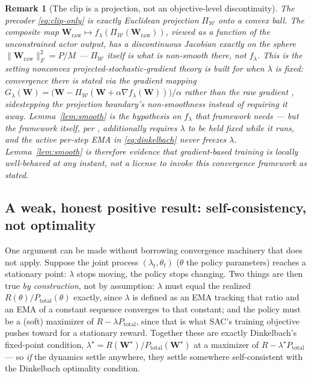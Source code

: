 \documentclass[11pt]{article}
\newtheorem{remark}{Remark}
\begin{document}
\begin{remark}[The clip is a projection, not an objective-level discontinuity]
The precoder \eqref{eq:clip-only} is exactly Euclidean projection
$\Pi_{\mathcal{W}}$ onto a convex ball. The composite map
$\mathbf{W}_{\text{raw}}\mapsto f_\lambda(\Pi_{\mathcal{W}}(\mathbf{W}_{\text{raw}}))$,
viewed as a function of the unconstrained actor output, has a discontinuous
Jacobian exactly on the sphere $\|\mathbf{W}_{\text{raw}}\|_F^2=P/M$ ---
$\Pi_{\mathcal{W}}$ itself is what is non-smooth there, not $f_\lambda$. This
is the setting nonconvex \emph{projected}-stochastic-gradient theory is
built for \emph{when $\lambda$ is fixed}: convergence there is stated via
the gradient mapping $G_\lambda(\mathbf{W}) =
\big(\mathbf{W}-\Pi_{\mathcal{W}}(\mathbf{W}+\alpha\nabla
f_\lambda(\mathbf{W}))\big)/\alpha$ rather than the raw gradient
\cite{GhadimiLanZhang2016}, sidestepping the projection boundary's
non-smoothness instead of requiring it away. Lemma~\ref{lem:smooth} is the
hypothesis on $f_\lambda$ that framework needs --- but the framework itself,
per \cite{GhadimiLan2013,GhadimiLanZhang2016}, additionally requires
$\lambda$ to be held fixed while it runs, and the active per-step EMA in
\eqref{eq:dinkelbach} never freezes $\lambda$. Lemma~\ref{lem:smooth} is
therefore evidence that gradient-based training is locally well-behaved
\emph{at any instant}, not a license to invoke this convergence framework
as stated.
\end{remark}

\subsection{A weak, honest positive result: self-consistency, not optimality}
\label{sec:fixedpoint}

One argument can be made without borrowing convergence machinery that
does not apply. Suppose the joint process $(\lambda_t,\theta_t)$ ($\theta$
the policy parameters) reaches a stationary point: $\lambda$ stops moving,
the policy stops changing. Two things are then true \emph{by construction},
not by assumption: $\lambda$ must equal the realized $R(\theta)/P_\text{total}(\theta)$
exactly, since $\lambda$ is defined as an EMA tracking that ratio and an EMA
of a constant sequence converges to that constant; and the policy must be a
(soft) maximizer of $R-\lambda P_\text{total}$, since that is what SAC's
training objective pushes toward for a stationary reward. Together these are
exactly Dinkelbach's fixed-point condition, $\lambda^\star =
R(\mathbf{W}^\star)/P_\text{total}(\mathbf{W}^\star)$ at a maximizer of
$R-\lambda^\star P_\text{total}$ --- so \emph{if} the dynamics settle
anywhere, they settle somewhere self-consistent with the Dinkelbach
optimality condition.
\end{document}
